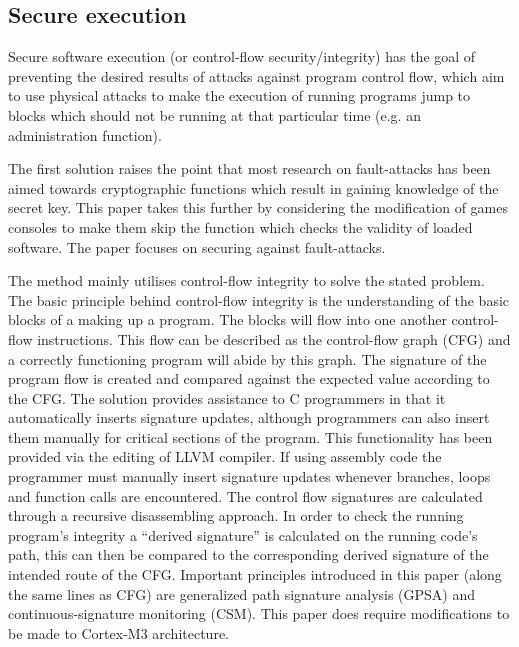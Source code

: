 \subsection{Secure execution}\label{secureExecutionSolutions}

Secure software execution (or control-flow security/integrity) has the goal of preventing the desired results of attacks against program control flow, which aim to use physical attacks to make the execution of running programs jump to blocks which should not be running at that particular time (e.g. an administration function).

The first solution \cite{Werner2016} raises the point that most research on fault-attacks has been aimed towards cryptographic functions which result in gaining knowledge of the secret key. This paper takes this further by considering the modification of games consoles to make them skip the function which checks the validity of loaded software. The paper focuses on securing against fault-attacks.

The method mainly utilises control-flow integrity to solve the stated problem. The basic principle behind control-flow integrity is the understanding of the basic blocks of a making up a program. The blocks will flow into one another control-flow instructions. This flow can be described as the control-flow graph (CFG) and a correctly functioning program will abide by this graph. The signature of the program flow is created and compared against the expected value according to the CFG. The solution provides assistance to C programmers in that it automatically inserts signature updates, although programmers can also insert them manually for critical sections of the program. This functionality has been provided via the editing of LLVM compiler. If using assembly code the programmer must manually insert signature updates whenever branches, loops and function calls are encountered. The control flow signatures are calculated through a  recursive disassembling approach. In order to check the running  program's integrity a ``derived signature'' is calculated on the running code's path, this can then be compared to the corresponding derived signature of the intended route of the CFG. Important principles introduced in this paper (along the same lines as CFG) are generalized path signature analysis (GPSA) and continuous-signature monitoring (CSM). This paper does require modifications to be made to Cortex-M3 architecture.

\ifnotesincluded
{} 

